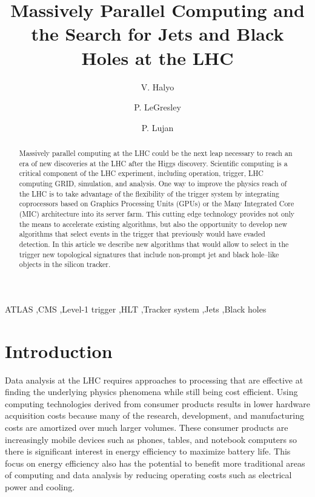 \documentclass[preprint,sort&compress]{elsarticle}
\begin{document}
\begin{frontmatter}

\title{Massively Parallel Computing and the Search for Jets and Black Holes at the LHC}

\author{V. Halyo}
\author{P. LeGresley}
\author{P. Lujan}
\address{Department of Physics, Princeton University, Princeton, NJ 08544, USA}


\begin{abstract}
Massively parallel computing at the LHC could be the next leap necessary to reach an era of new discoveries at
the LHC after the Higgs discovery. Scientific computing is a critical component of the LHC experiment, including
operation, trigger, LHC computing GRID, simulation, and analysis. One way to improve the physics reach of the LHC is to
take advantage of the flexibility of the trigger system by integrating coprocessors based on Graphics Processing Units 
(GPUs) or the Many Integrated Core (MIC) architecture into its server farm. This cutting edge technology provides not 
only the means to accelerate existing algorithms, but also the opportunity to develop new algorithms that select events
 in the trigger that previously would have evaded detection. In this article we describe new algorithms that would allow 
to select in the trigger new topological signatures that include non-prompt jet and black hole--like objects 
in the silicon tracker.
\end{abstract}

\begin{keyword}
ATLAS \sep CMS \sep Level-1 trigger \sep HLT \sep Tracker system \sep Jets \sep Black holes
\end{keyword}

\end{frontmatter}

\section{Introduction} 

Data analysis at the LHC requires approaches to processing that are effective at finding the underlying physics phenomena while still being cost efficient.  Using computing technologies derived from consumer products results in lower hardware acquisition costs because many of the research, development, and manufacturing costs are amortized over much larger volumes.  These consumer products are increasingly mobile devices such as phones, tables, and notebook computers so there is significant interest in energy efficiency to maximize battery life.  This focus on energy efficiency also has the potential to benefit more traditional areas of computing and data analysis by reducing operating costs such as electrical power and cooling.
\end{document}
